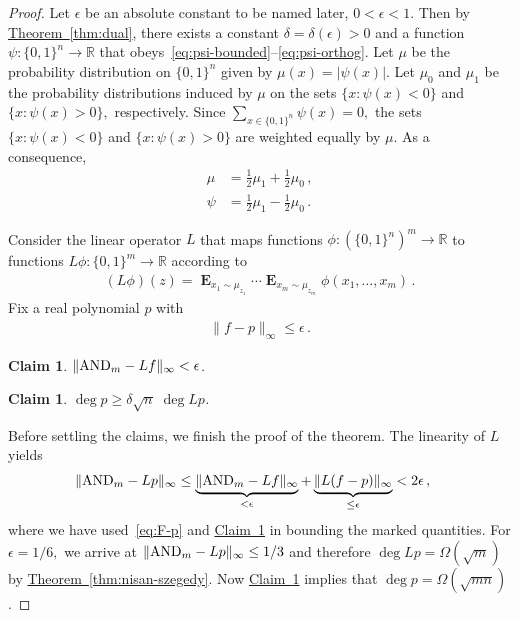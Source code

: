 \documentclass[10pt]{article}
\newtheorem{claim}[theorem]{Claim}
\theoremstyle{definition}
\numberwithin{equation}{section}
\newcommand{\R}{{\mathbb R}}
\newcommand{\expref}[2]{\texorpdfstring{\hyperref[#2]{#1~\ref{#2}}}{#1~\ref{#2}}}
\newcommand{\AND}     {\text{\rm AND}}
\DeclareMathOperator*{\Exp}{\mathbf{E}}
\newcommand{\1}{\mathbf{1}}
\newcommand{\zoo}{\{0,1\}}
\newcommand{\zoon}{\zoo^n}
\newcommand{\zoom}{\zoo^m}
\begin{document}
\begin{proof}
Let $\epsilon$ be an absolute constant to be named later, $0<\epsilon<1$.
Then by \expref{Theorem}{thm:dual}, there exists a constant $\delta=\delta(\epsilon)>0$
and a function $\psi\colon\zoon\to\R$ that
obeys~\eqref{eq:psi-bounded}--\eqref{eq:psi-orthog}.
Let $\mu$ be the probability distribution on $\zoon$ given by $\mu(x)=|\psi(x)|$.
Let $\mu_0$ and $\mu_1$ be the probability distributions induced
by $\mu$ on the sets $\{x:\psi(x)<0\}$ and $\{x:\psi(x)>0\},$ respectively.
Since $\sum_{x\in\zoon}\psi(x)=0,$ the sets $\{x:\psi(x)<0\}$ and
$\{x:\psi(x)>0\}$ are weighted equally by $\mu$. As a consequence,
\begin{align}
\mu & =\frac12\mu_1+\frac12\mu_0\,,\label{eq:mu-mu0-mu1}\\
\psi & =\frac12\mu_1-\frac12\mu_0\,.\label{eq:psi-mu0-mu1}
\end{align}
 
 
Consider the linear operator $L$ that maps functions $\phi\colon(\zoon)^m\to\R$
to functions $L\phi\colon\zoom\to\R$ according to
\begin{align*}
(L\phi)(z)=\Exp_{x_1\sim\mu_{z_1}}\cdots\Exp_{x_m\sim\mu_{z_m}}\phi(x_1,\dots,x_m)\,.
\end{align*}
Fix a real polynomial $p$ with
\begin{align}
\|f-p\|_{\infty}\leq\epsilon\,.\label{eq:F-p}
\end{align}
 
\begin{claim} \label{cla:Lf-AND}
\quad $\|\AND_m-Lf\|_{\infty}<\epsilon$.
\end{claim}
 
\begin{claim}
\label{cla:deg}
\quad $\deg p\geq\delta\sqrt{n}\;\deg Lp$.
\end{claim}

Before settling the claims, we finish the proof of the theorem. The
linearity of $L$ yields
\begin{align*}
\|\AND_m-Lp\|_{\infty} & \leq\underbrace{\|\AND_m-Lf\|_{\infty}}_{<\epsilon}
+\underbrace{\|L(f-p)\|_{\infty}}_{\leq\epsilon}<2\epsilon\,,
\end{align*}
where we have used~\eqref{eq:F-p} and \expref{Claim}{cla:Lf-AND} in
bounding the marked quantities. For $\epsilon=1/6,$ we arrive at
$\|\AND_m-Lp\|_{\infty}\leq1/3$ and therefore $\deg Lp=\Omega(\sqrt{m})$
by \expref{Theorem}{thm:nisan-szegedy}. Now \expref{Claim}{cla:deg} implies
that $\deg p=\Omega(\sqrt{mn})$.
\end{proof}
 
\end{document}
